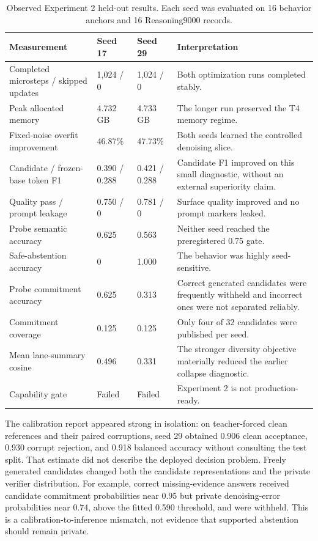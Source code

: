 \documentclass[10pt,a4paper]{article}
\begin{document}
\begin{table}[htbp]
\caption{Observed Experiment 2 held-out results. Each seed was evaluated on 16
behavior anchors and 16 Reasoning9000 records.}
\label{tab:study2}
\centering\footnotesize
\begin{tabularx}{\textwidth}{@{}>{\raggedright\arraybackslash}p{}llX@{}}
\toprule
\textbf{Measurement} & \textbf{Seed 17} & \textbf{Seed 29} & \textbf{Interpretation} \\
\midrule
Completed microsteps / skipped updates & 1{,}024 / 0 & 1{,}024 / 0 & Both optimization runs completed stably. \\
Peak allocated memory & 4.732\,GB & 4.733\,GB & The longer run preserved the T4 memory regime. \\
Fixed-noise overfit improvement & 46.87\% & 47.73\% & Both seeds learned the controlled denoising slice. \\
Candidate / frozen-base token F1 & 0.390 / 0.288 & 0.421 / 0.288 & Candidate F1 improved on this small diagnostic, without an external superiority claim. \\
Quality pass / prompt leakage & 0.750 / 0 & 0.781 / 0 & Surface quality improved and no prompt markers leaked. \\
Probe semantic accuracy & 0.625 & 0.563 & Neither seed reached the preregistered 0.75 gate. \\
Safe-abstention accuracy & 0 & 1.000 & The behavior was highly seed-sensitive. \\
Probe commitment accuracy & 0.625 & 0.313 & Correct generated candidates were frequently withheld and incorrect ones were not separated reliably. \\
Commitment coverage & 0.125 & 0.125 & Only four of 32 candidates were published per seed. \\
Mean lane-summary cosine & 0.496 & 0.331 & The stronger diversity objective materially reduced the earlier collapse diagnostic. \\
Capability gate & Failed & Failed & Experiment 2 is not production-ready. \\
\bottomrule
\end{tabularx}
\end{table}

The calibration report appeared strong in isolation: on teacher-forced clean
references and their paired corruptions, seed 29 obtained 0.906 clean
acceptance, 0.930 corrupt rejection, and 0.918 balanced accuracy without
consulting the test split. That estimate did not describe the deployed
decision problem. Freely generated candidates changed both the candidate
representations and the private verifier distribution. For example, correct
missing-evidence answers received candidate commitment probabilities near
0.95 but private denoising-error probabilities near 0.74, above the fitted
0.590 threshold, and were withheld. This is a calibration-to-inference
mismatch, not evidence that supported abstention should remain private.
\end{document}
